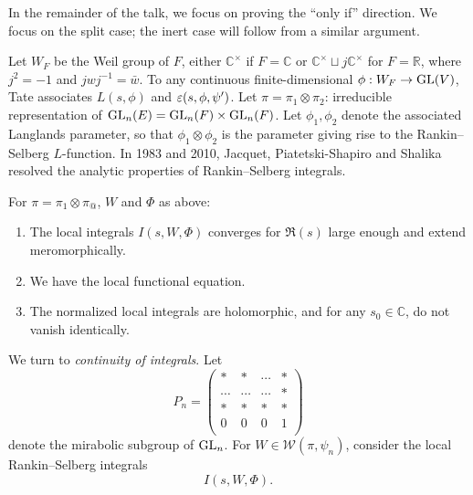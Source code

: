 \documentclass[reqno]{amsart} 
\begin{document}
In the remainder of the talk, we focus on proving the ``only if'' direction.  We focus on the split case; the inert case will follow from a similar argument.

Let $W_F$ be the Weil group of $F$, either $\mathbb{C}^\times$ if $F = \mathbb{C}$ or $\mathbb{C}^\times \sqcup j \mathbb{C}^\times$ for $F = \mathbb{R}$, where $j^2 =  - 1$ and $j w j^{-1} = \bar{w}$.  To any continuous finite-dimensional $\phi : W_F \rightarrow \operatorname{GL}(V)$, Tate associates $L(s, \phi)$ and $\varepsilon(s, \phi, \psi ')$.  Let $\pi = \pi_1 \otimes \pi_2$: irreducible representation of $\operatorname{GL}_n(E) = \operatorname{GL}_n(F) \times \operatorname{GL}_n(F)$.  Let $\phi_1, \phi_2$ denote the associated Langlands parameter, so that $\phi_1 \otimes \phi_2$ is the parameter giving rise to the Rankin--Selberg $L$-function.  In 1983 and 2010, Jacquet, Piatetski-Shapiro and Shalika resolved the analytic properties of Rankin--Selberg integrals.
\begin{theorem}
  For $\pi = \pi_1 \otimes \pi_@$, $W$ and $\Phi$ as above:
  \begin{enumerate}
  \item The local integrals $I(s, W, \Phi)$ converges for $\Re(s)$ large enough and extend meromorphically.
  \item We have the local functional equation.
  \item The normalized local integrals are holomorphic, and for any $s_0 \in \mathbb{C}$, do not vanish identically.
  \end{enumerate}
\end{theorem}

We turn to \emph{continuity of integrals}.  Let
\begin{equation*}
  P _n =
  \begin{pmatrix}
    \ast    & \ast & \dotsb & \ast \\
    \dotsb            & \dotsb & \dotsb & \ast \\
    \ast            & \ast & \ast & \ast \\
    0            & 0 & 0 & 1 \\
  \end{pmatrix}
\end{equation*}
denote the mirabolic subgroup of $\operatorname{GL}_n$.  For $W \in \mathcal{W}(\pi, \psi_n)$, consider the local Rankin--Selberg integrals
\begin{equation*}
  I(s, W, \Phi).
\end{equation*}
\end{document}
